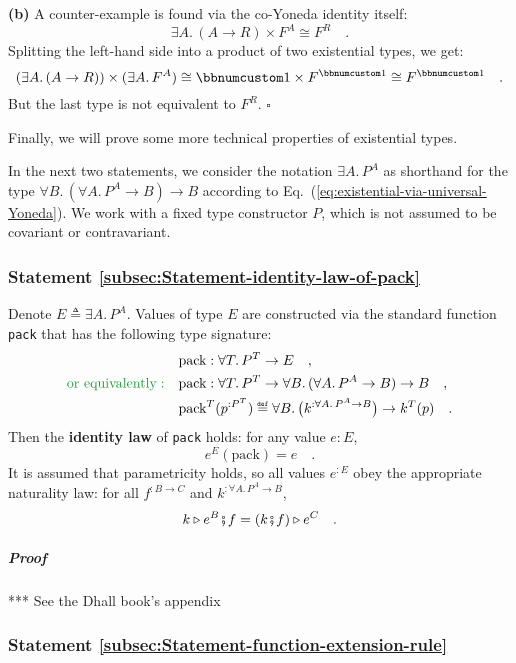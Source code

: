 \textbf{(b)} A counter-example is found via the co-Yoneda identity
itself:
\[
\exists A.\,(A\rightarrow R)\times F^{A}\cong F^{R}\quad.
\]
Splitting the left-hand side into a product of two existential types,
we get:
\[
(\exists A.\,(A\rightarrow R))\times(\exists A.\,F^{A})\cong\bbnum 1\times F^{\bbnum 1}\cong F^{\bbnum 1}\quad.
\]
But the last type is not equivalent to $F^{R}$. $\square$

Finally, we will prove some more technical properties of existential
types.

In the next two statements, we consider the notation $\exists A.\,P^{A}$
as shorthand for the type $\forall B.\,(\forall A.\,P^{A}\rightarrow B)\rightarrow B$
according to Eq.~(\ref{eq:existential-via-universal-Yoneda}). We
work with a fixed type constructor $P$, which is not assumed to be
covariant or contravariant.

\subsubsection{Statement \label{subsec:Statement-identity-law-of-pack}\ref{subsec:Statement-identity-law-of-pack}}

Denote $E\triangleq\exists A.\,P^{A}$. Values of type $E$ are constructed
via the standard function \lstinline!pack! that has the following
type signature:
\begin{align*}
 & \text{pack}:\forall T.\,P^{T}\rightarrow E\quad,\\
{\color{greenunder}\text{or equivalently}:}\quad & \text{pack}:\forall T.\,P^{T}\rightarrow\forall B.\,(\forall A.\,P^{A}\rightarrow B)\rightarrow B\quad,\\
 & \text{pack}^{T}(p^{:P^{T}})\triangleq\forall B.\,\big(k^{:\forall A.\,P^{A}\rightarrow B}\big)\rightarrow k^{T}(p)\quad.
\end{align*}
Then the \textbf{identity law} of
\lstinline!pack! holds: for any value $e:E$, 
\[
e^{E}(\text{pack})=e\quad.
\]
It is assumed that parametricity holds, so all values $e^{:E}$ obey
the appropriate naturality law: for all $f^{:B\rightarrow C}$ and
$k^{:\forall A.\,P^{A}\rightarrow B}$,
\[
k\triangleright e^{B}\bef f=(k\bef f)\triangleright e^{C}\quad.
\]


\subparagraph{Proof}

{*}{*}{*} See the Dhall book\textsf{'}s appendix

\subsubsection{Statement \label{subsec:Statement-function-extension-rule}\ref{subsec:Statement-function-extension-rule}}

